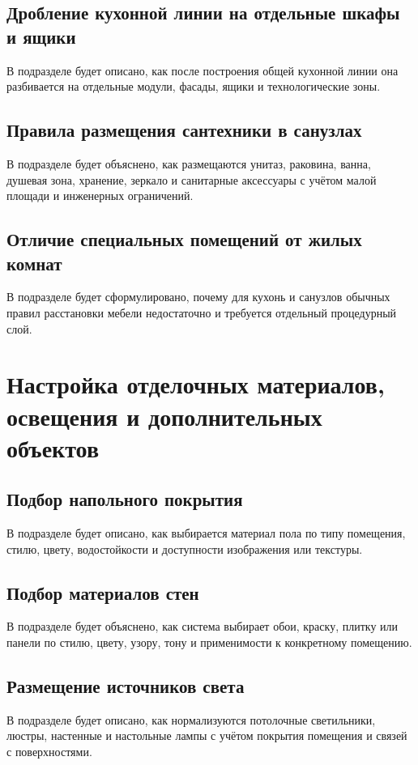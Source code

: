 \documentclass[times]{itmo-student-thesis}
\begin{document}
\subsection{Дробление кухонной линии на отдельные шкафы и ящики}
В подразделе будет описано, как после построения общей кухонной линии она разбивается на отдельные модули, фасады, ящики и технологические зоны.

\subsection{Правила размещения сантехники в санузлах}
В подразделе будет объяснено, как размещаются унитаз, раковина, ванна, душевая зона, хранение, зеркало и санитарные аксессуары с учётом малой площади и инженерных ограничений.

\subsection{Отличие специальных помещений от жилых комнат}
В подразделе будет сформулировано, почему для кухонь и санузлов обычных правил расстановки мебели недостаточно и требуется отдельный процедурный слой.

\section{Настройка отделочных материалов, освещения и дополнительных объектов}

\subsection{Подбор напольного покрытия}
В подразделе будет описано, как выбирается материал пола по типу помещения, стилю, цвету, водостойкости и доступности изображения или текстуры.

\subsection{Подбор материалов стен}
В подразделе будет объяснено, как система выбирает обои, краску, плитку или панели по стилю, цвету, узору, тону и применимости к конкретному помещению.

\subsection{Размещение источников света}
В подразделе будет описано, как нормализуются потолочные светильники, люстры, настенные и настольные лампы с учётом покрытия помещения и связей с поверхностями.
\end{document}
